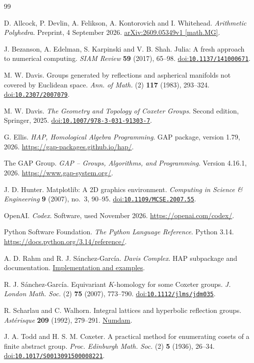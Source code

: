 \documentclass[11pt]{article}
\newcommand{\doi}[1]{\href{https://doi.org/#1}{\mbox{doi:\nolinkurl{#1}}}}
\begin{document}
\begin{thebibliography}{99}
\small\raggedright
\setlength{\itemsep}{2pt}

 D. Allcock, P. Devlin, A. Felikson, A. Kontorovich and I. Whitehead.
\emph{Arithmetic Polyhedra}. Preprint, 4 September 2026.
\href{https://arxiv.org/abs/2609.05349v1}{arXiv:2609.05349v1 [math.MG]}.

 J. Bezanson, A. Edelman, S. Karpinski and V. B. Shah.
Julia: A fresh approach to numerical computing. \emph{SIAM Review} \textbf{59} (2017), 65--98. \doi{10.1137/141000671}.

 M. W. Davis. Groups generated by reflections and aspherical manifolds not covered by Euclidean space. \emph{Ann. of Math.} (2) \textbf{117} (1983), 293--324. \doi{10.2307/2007079}.

 M. W. Davis. \emph{The Geometry and Topology of Coxeter Groups}.
Second edition, Springer, 2025. \doi{10.1007/978-3-031-91303-7}.

 G. Ellis. \emph{HAP, Homological Algebra Programming}.
GAP package, version 1.79, 2026. \mbox{\url{https://gap-packages.github.io/hap/}}.

 The GAP Group. \emph{GAP -- Groups, Algorithms, and Programming}.
Version 4.16.1, 2026. \mbox{\url{https://www.gap-system.org/}}.

 J. D. Hunter. Matplotlib: A 2D graphics environment.
\emph{Computing in Science \& Engineering} \textbf{9} (2007), no.~3, 90--95. \doi{10.1109/MCSE.2007.55}.

 OpenAI. \emph{Codex}. Software, used November 2026. \mbox{\url{https://openai.com/codex/}}.

 Python Software Foundation. \emph{The Python Language Reference}.
Python 3.14. \mbox{\url{https://docs.python.org/3.14/reference/}}.

 A. D. Rahm and R. J. S\'anchez-Garc\'ia. \emph{Davis Complex}.
HAP subpackage and documentation. \href{https://gaati.org/rahm/subpackage-documentation/aboutDavisComplex.html}{Implementation and examples}.

 R. J. S\'anchez-Garc\'ia. Equivariant \(K\)-homology for some Coxeter groups.
\emph{J. London Math. Soc.} (2) \textbf{75} (2007), 773--790. \doi{10.1112/jlms/jdm035}.

 R. Scharlau and C. Walhorn. Integral lattices and hyperbolic reflection groups.
\emph{Ast\'erisque} \textbf{209} (1992), 279--291. \href{https://numdam.org/book-part/AST_1992__209__279_0/}{Numdam}.

 J. A. Todd and H. S. M. Coxeter. A practical method for enumerating cosets of a finite abstract group.
\emph{Proc. Edinburgh Math. Soc.} (2) \textbf{5} (1936), 26--34. \doi{10.1017/S0013091500008221}.
\end{thebibliography}
\end{document}
